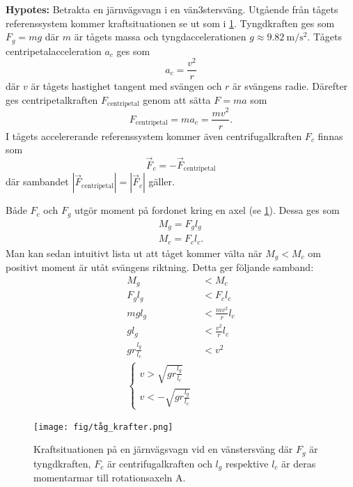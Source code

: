 \textbf{Hypotes:} Betrakta en järnvägsvagn i en vän3stersväng. Utgående från tågets referenssystem kommer kraftsituationen se ut som i \cref{fig:tåg_krafter_sväng}. Tyngdkraften ges som $F_g = mg$ där $m$ är tågets massa och tyngdaccelerationen $g\approx \SI{9.82}{\m\per\s\squared}$. Tågets centripetalacceleration $a_c$ ges som
\begin{equation}
        a_c = \frac{v^2}{r}
\end{equation}
 där $v$ är tågets hastighet tangent med svängen och $r$ är svängens radie. Därefter ges centripetalkraften $F_\mathrm{centripetal}$ genom att sätta $F = ma$ som
 \begin{equation}
    F_\mathrm{centripetal} = ma_c = \frac{mv^2}{r}.
 \end{equation}
 I tågets accelererande referenssystem kommer även centrifugalkraften $F_c$ finnas som
 \begin{equation}
    \vec F_c = -\vec F_\mathrm{centripetal}
 \end{equation}
 där sambandet $|\vec F_\mathrm{centripetal}| = |\vec F_c|$ gäller.

Både $F_c$ och $F_g$ utgör moment på fordonet kring en axel (se \cref{fig:tåg_krafter_sväng}). Dessa ges som
\begin{gather}
    M_g = F_g l_g \\
    M_c = F_c l_c.
\end{gather}
Man kan sedan intuitivt lista ut att tåget kommer välta när $M_g < M_c$  om positivt moment är utåt svängens riktning. Detta ger följande samband:
\begin{align*}
    M_g &< M_c \\
    F_g l_g &< F_c l_c \\
    mg l_g &< \frac{mv^2}{r} l_c \\
    g l_g &< \frac{v^2}{r} l_c \\
    g r \frac{l_g}{l_c} &< v^2 \\
    \left\{
        \begin{array}{l}
            v > \sqrt{g r \frac{l_g}{l_c}} \\
            v < -\sqrt{g r \frac{l_g}{l_c}}
        \end{array}
    \right.
\end{align*}

\begin{figure}[h!]
    \centering
    \texttt{[image: fig/tåg\_krafter.png]}
    \caption{Kraftsituationen på en järnvägsvagn vid en vänstersväng där $F_g$ är tyngdkraften, $F_c$ är centrifugalkraften och $l_g$ respektive $l_c$ är deras momentarmar till rotationsaxeln A.}
    \label{fig:tåg_krafter_sväng}
\end{figure}

